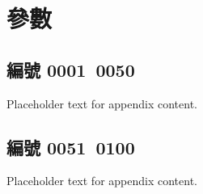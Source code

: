 \chapter{參數}
\section{編號 0001~0050}
Placeholder text for appendix content.

\section{編號 0051~0100}
Placeholder text for appendix content.
